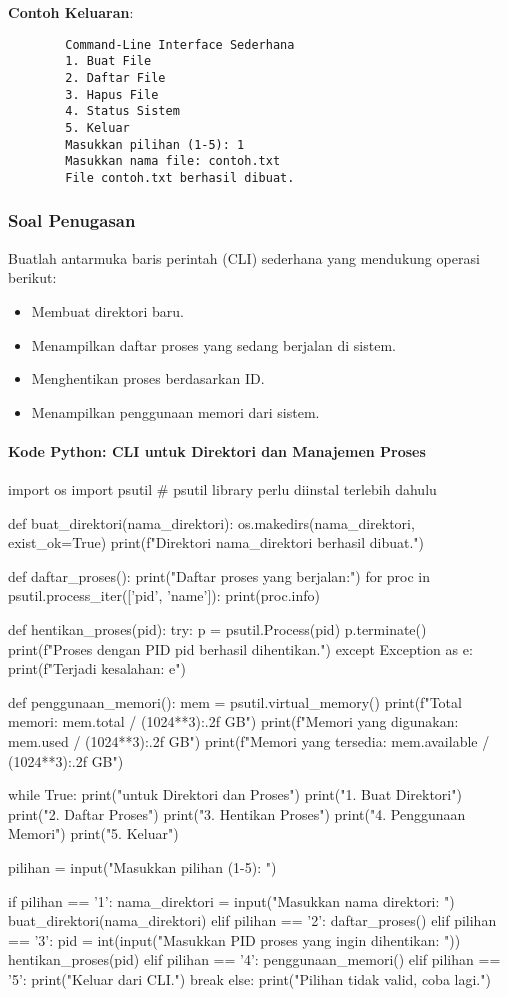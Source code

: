 \documentclass[12pt]{article}
\begin{document}
	\textbf{Contoh Keluaran}:
	\begin{verbatim}
		Command-Line Interface Sederhana
		1. Buat File
		2. Daftar File
		3. Hapus File
		4. Status Sistem
		5. Keluar
		Masukkan pilihan (1-5): 1
		Masukkan nama file: contoh.txt
		File contoh.txt berhasil dibuat.
	\end{verbatim}
	
	\subsubsection{Soal Penugasan}
	Buatlah antarmuka baris perintah (CLI) sederhana yang mendukung operasi berikut:
	\begin{itemize}
		\item Membuat direktori baru.
		\item Menampilkan daftar proses yang sedang berjalan di sistem.
		\item Menghentikan proses berdasarkan ID.
		\item Menampilkan penggunaan memori dari sistem.
	\end{itemize}
	
	\paragraph{Kode Python: CLI untuk Direktori dan Manajemen Proses}
	
	\begin{python}
		import os
		import psutil  # psutil library perlu diinstal terlebih dahulu
		
		def buat_direktori(nama_direktori):
		os.makedirs(nama_direktori, exist_ok=True)
		print(f"Direktori {nama_direktori} berhasil dibuat.")
		
		def daftar_proses():
		print("Daftar proses yang berjalan:")
		for proc in psutil.process_iter(['pid', 'name']):
		print(proc.info)
		
		def hentikan_proses(pid):
		try:
		p = psutil.Process(pid)
		p.terminate()
		print(f"Proses dengan PID {pid} berhasil dihentikan.")
		except Exception as e:
		print(f"Terjadi kesalahan: {e}")
		
		def penggunaan_memori():
		mem = psutil.virtual_memory()
		print(f"Total memori: {mem.total / (1024**3):.2f} GB")
		print(f"Memori yang digunakan: {mem.used / (1024**3):.2f} GB")
		print(f"Memori yang tersedia: {mem.available / (1024**3):.2f} GB")
		
		while True:
		print("\nCLI untuk Direktori dan Proses")
		print("1. Buat Direktori")
		print("2. Daftar Proses")
		print("3. Hentikan Proses")
		print("4. Penggunaan Memori")
		print("5. Keluar")
		
		pilihan = input("Masukkan pilihan (1-5): ")
		
		if pilihan == '1':
		nama_direktori = input("Masukkan nama direktori: ")
		buat_direktori(nama_direktori)
		elif pilihan == '2':
		daftar_proses()
		elif pilihan == '3':
		pid = int(input("Masukkan PID proses yang ingin dihentikan: "))
		hentikan_proses(pid)
		elif pilihan == '4':
		penggunaan_memori()
		elif pilihan == '5':
		print("Keluar dari CLI.")
		break
		else:
		print("Pilihan tidak valid, coba lagi.")
	\end{python}
	
\end{document}
